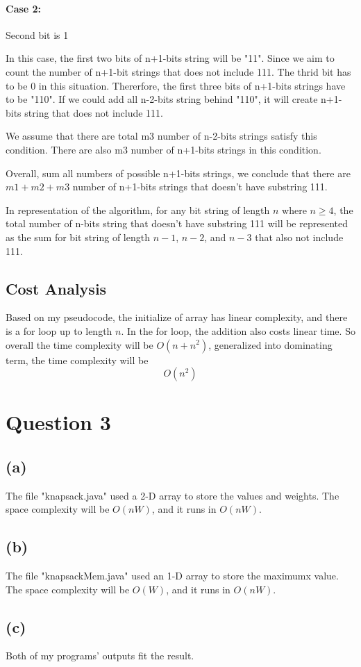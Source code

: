 \documentclass{article}
\begin{document}
\paragraph*{Case 2:} Second bit is 1

In this case, the first two bits of n+1-bits string will be "11". Since we aim to count the number of n+1-bit strings
that does not include 111. The thrid bit has to be 0 in this situation. Thererfore, the first three bits of n+1-bits strings 
have to be "110". If we could add all n-2-bits string behind "110", it will create n+1-bits string that does not include 111.

We assume that there are total m3 number of n-2-bits strings satisfy this condition. There are also m3 number of n+1-bits strings
in this condition.

Overall, sum all numbers of possible n+1-bits strings, we conclude that there are $m1+m2+m3$ number of n+1-bits strings
that doesn't have substring 111.

In representation of the algorithm, for any bit string of length $n$ where $n \geq 4$, the total number of n-bits string that 
doesn't have substring 111 will be represented as the sum for bit string of length $n-1$, $n-2$, and $n-3$ that also not include 111.

\subsection*{Cost Analysis}

Based on my pseudocode, the initialize of array has linear complexity, and there is a for loop up to length $n$. In the for loop, the addition also costs linear time.
So overall the time complexity will be $O(n+n^2)$, generalized into dominating term, the time complexity will be 
$$O(n^2)$$


\section*{Question 3}
\subsection*{(a)}

The file "knapsack.java" used a 2-D array to store the values and weights.
The space complexity will be $O(nW)$, and it runs in $O(nW)$.
\subsection*{(b)}

The file "knapsackMem.java" used an 1-D array to store the maximumx value.
The space complexity will be $O(W)$, and it runs in $O(nW)$.
\subsection*{(c)}
Both of my programs' outputs fit the result.
\end{document}
